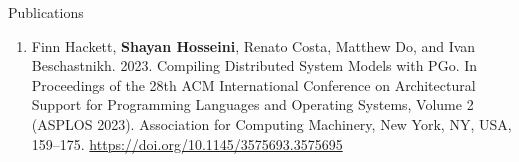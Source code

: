 \documentclass{resume} %
\begin{document}

\begin{rSection}{Publications}
  \begin{enumerate}
    \item 
      Finn Hackett, {\bf Shayan Hosseini}, Renato Costa, Matthew Do, and Ivan
      Beschastnikh. 2023. Compiling Distributed System Models with PGo. In
      Proceedings of the 28th ACM International Conference on Architectural
      Support for Programming Languages and Operating Systems, Volume 2 (ASPLOS
      2023). Association for Computing Machinery, New York, NY, USA, 159–175.
      \href{https://doi.org/10.1145/3575693.3575695}{https://doi.org/10.1145/3575693.3575695}
  \end{enumerate}
\end{rSection}

\end{document}
